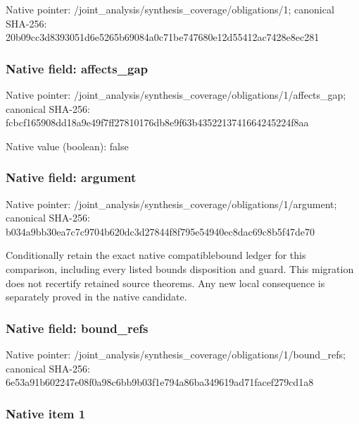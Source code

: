 \documentclass[10pt,a4paper]{article}
\begin{document}
Native pointer: /joint\_analysis/synthesi\allowbreak{}s\_coverage/obligations/1; canonical SHA-256: 20b09cc3d8393051d6e5265b\allowbreak{}69084a0c71be747680e12d55\allowbreak{}412ac7428e8ec281



\subsubsection{Native field: affects\_gap}


Native pointer: /joint\_analysis/synthesi\allowbreak{}s\_coverage/obligations/1\allowbreak{}/affects\_gap; canonical SHA-256: fcbcf165908dd18a9e49f7ff\allowbreak{}27810176db8e9f63b4352213\allowbreak{}741664245224f8aa



Native value (boolean): false



\subsubsection{Native field: argument}


Native pointer: /joint\_analysis/synthesi\allowbreak{}s\_coverage/obligations/1\allowbreak{}/argument; canonical SHA-256: b034a9bb30ea7c7c9704b620\allowbreak{}dc3d27844f8f795e54940ec8\allowbreak{}dac69c8b5f47de70


Conditionally retain the exact native compatiblebound ledger for this comparison, including every listed bounds disposition and guard. This migration does not recertify retained source theorems. Any new local consequence is separately proved in the native candidate.


\subsubsection{Native field: bound\_refs}


Native pointer: /joint\_analysis/synthesi\allowbreak{}s\_coverage/obligations/1\allowbreak{}/bound\_refs; canonical SHA-256: 6e53a91b602247e08f0a98c6\allowbreak{}bb9b03f1e794a86ba349619a\allowbreak{}d71facef279cd1a8



\subsubsection{Native item 1}
\end{document}
